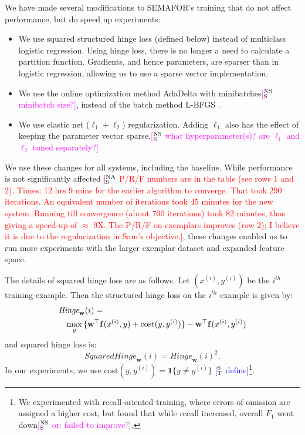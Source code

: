 \documentclass[11pt,a4paper]{article}
\newcommand{\indicator}[1]{\boldsymbol{1}\{#1\}}
\newcommand{\ensuretext}[1]{#1}
\newcommand{\nssmarker}{\ensuretext{\textcolor{magenta}{\ensuremath{^{\textsc{NS}}_{\textsc{S}}}}}}
\newcommand{\nasmarker}{\ensuretext{\textcolor{red}{\ensuremath{^{\textsc{NA}}_{\textsc{S}}}}}}
\newcommand{\stmarker}{\ensuretext{\textcolor{blue}{\ensuremath{^{\textsc{S}}_{\textsc{T}}}}}}
\newcommand{\arkcomment}[3]{\ensuretext{\textcolor{#3}{[#1 #2]}}}
\newcommand{\nss}[1]{\arkcomment{\nssmarker}{#1}{magenta}}
\newcommand{\mk}[1]{\arkcomment{\nasmarker}{#1}{red}}
\newcommand{\st}[1]{\arkcomment{\stmarker}{#1}{blue}}
\begin{document}
We have made several modifications to SEMAFOR's training that do not affect performance, but do speed up experiments:

\begin{itemize}
  \item We use squared structured hinge loss (defined below) instead of multiclass logistic regression.
  Using hinge loss, there is no longer a need to calculate a partition function.
  Gradients, and hence parameters, are sparser than in logistic regression, allowing us to use a sparse vector implementation.
  \item We use the online optimization method AdaDelta \citep{zeiler-12} with minibatches\nss{minibatch size?}, instead of the batch method L-BFGS \citep{liu-89}.
  \item We use elastic net ($\ell_1 + \ell_2$) regularization. Adding $\ell_1$ also has the effect of keeping the parameter vector sparse.\nss{what hyperparameter(s)? are $\ell_1$ and $\ell_2$ tuned separately?}
\end{itemize}
We use these changes for all systems, including the baseline.
While performance is not significantly affected \mk{P/R/F numbers are in the table (see rows 1 and 2). Times: 12 hrs 9 mins for the earlier algorithm to converge. That took 290 iterations. An equivalent number of iterations took 45 minutes for the new system. Running till convergence (about 700 iterations) took 82 minutes, thus giving a speed-up of $\approx$ 9X. The P/R/F on exemplars improves (row 2); I believe it is due to the regularization in Sam's objective.}, these changes enabled us to run more experiments with the larger exemplar dataset and expanded feature space. 

The details of squared hinge loss are as follows.
Let $(x^{(i)}, y^{(i)})$ be the $i^{th}$ training example.
Then the structured hinge loss on the $i^{th}$ example is given by:
\begin{align*}
\lefteqn{\textit{Hinge}_\mathbf{w}(i) =} \\
&&\max_y{\{\mathbf{w}^\top \mathbf{f}(x^{(i)}, y) + \text{cost}(y, y^{(i)})\}} - \mathbf{w}^\top \mathbf{f}(x^{(i)}, y^{(i)})
\end{align*}
and squared hinge loss is:
\begin{equation}
\textit{SquaredHinge}_\mathbf{w}(i) =
\textit{Hinge}_\mathbf{w}(i)^2.
\end{equation}
In our experiments, we use $\text{cost}(y, y^{(i)}) = \indicator{y \ne y^{(i)}}$ \st{define}\footnote{We experimented with recall-oriented training, where errors of omission are assigned a higher cost, but found that while recall increased, overall $F_1$ went down\nss{or: failed to improve?}.}.
\end{document}
